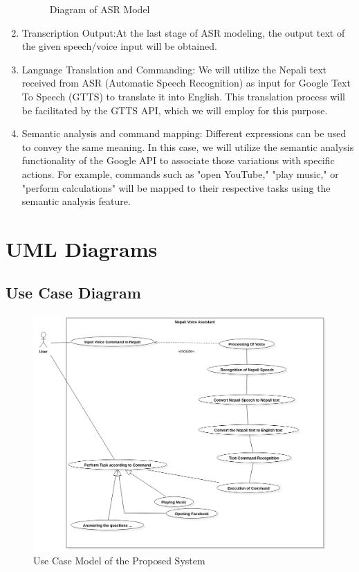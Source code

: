 \begin{enumerate}
\begin{figure}[h!]
    \caption{Diagram of  ASR Model}
    \label{fig:my_label}
\end{figure}
\newpage
	\item  Transcription Output:At the last stage of ASR modeling, the output text of the given speech/voice input will be obtained.
	\item Language Translation and Commanding: We will utilize the Nepali text received from ASR (Automatic Speech Recognition) as input for Google Text To Speech (GTTS) to translate it into English. This translation process will be facilitated by the GTTS API, which we will employ for this purpose.
	\item Semantic analysis and command mapping: Different expressions can be used to convey the same meaning. In this case, we will utilize the semantic analysis functionality of the Google API to associate those variations with specific actions. For example, commands such as "open YouTube," "play music," or "perform calculations" will be mapped to their respective tasks using the semantic analysis feature.
	
\end{enumerate}
\newpage
\section{\ac{UML} Diagrams}
\subsection*{Use Case Diagram}
\begin{figure}[h!]
    \includegraphics[scale=0.45]{images/usecase.png}
    \caption{Use Case Model of the Proposed System}
    \label{fig:my_label}
\end{figure}
\newpage

